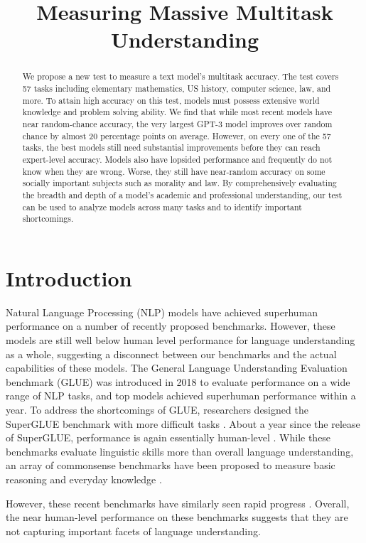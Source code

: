 \title{Measuring Massive Multitask Understanding}

\begin{abstract}
We propose a new test to measure a text model's multitask accuracy. The test covers 57 tasks including elementary mathematics, US history, computer science, law, and more. To attain high accuracy on this test, models must possess extensive world knowledge and problem solving ability. We find that while most recent models have near random-chance accuracy, the very largest GPT-3 model improves over random chance by almost 20 percentage points on average. However, on every one of the 57 tasks, the best models still need substantial improvements before they can reach expert-level accuracy. Models also have lopsided performance and frequently do not know when they are wrong. Worse, they still have near-random accuracy on some socially important subjects such as morality and law. By comprehensively evaluating the breadth and depth of a model's academic and professional understanding, our test can be used to analyze models across many tasks and to identify important shortcomings.
\end{abstract}

\section{Introduction}

Natural Language Processing (NLP) models have achieved superhuman performance on a number of recently proposed benchmarks. However, these models are still well below human level performance for language understanding as a whole, suggesting a disconnect between our benchmarks and the actual capabilities of these models. The General Language Understanding Evaluation benchmark (GLUE) \citep{wang2018glue} was introduced in 2018 to evaluate performance on a wide range of NLP tasks, and top models achieved superhuman performance within a year. To address the shortcomings of GLUE, researchers designed the SuperGLUE benchmark with more difficult tasks \citep{wang2019superglue}. About a year since the release of SuperGLUE, performance is again essentially human-level \citep{raffel2019exploringT5}. While these benchmarks evaluate linguistic skills more than overall language understanding, an array of commonsense benchmarks have been proposed to measure basic reasoning and everyday knowledge \citep{zellers2019hellaswag,huang2019cosmosqa,bisk2019physicaliqa}. 

However, these recent benchmarks have similarly seen rapid progress \citep{khashabi2020unifiedqa}. Overall, the near human-level performance on these benchmarks suggests that they are not capturing important facets of language understanding.

